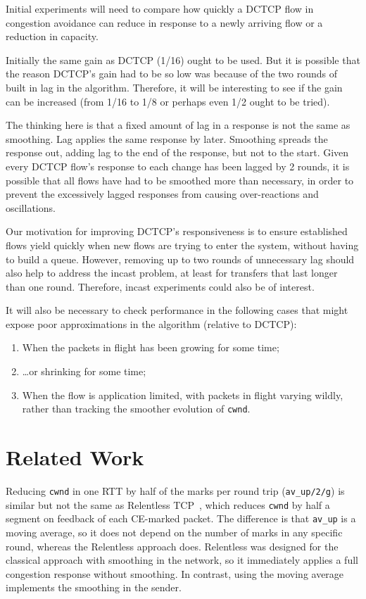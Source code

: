 Initial experiments will need to compare how quickly a DCTCP flow in congestion
avoidance can reduce in response to a newly arriving flow or a reduction in
capacity.

Initially the same gain as DCTCP (1/16) ought to be used. But it is possible
that the reason DCTCP's gain had to be so low was because of the two rounds of
built in lag in the algorithm. Therefore, it will be interesting to see if the
gain can be increased (from 1/16 to 1/8 or perhaps even 1/2 ought to be tried).

The thinking here is that a fixed amount of lag in a response is not the same as
smoothing. Lag applies the same response by later. Smoothing spreads the
response out, adding lag to the end of the response, but not to the start. Given
every DCTCP flow's response to each change has been lagged by 2 rounds, it is
possible that all flows have had to be smoothed more than necessary, in order to
prevent the excessively lagged responses from causing over-reactions and
oscillations.

Our motivation for improving DCTCP's responsiveness is to ensure established
flows yield quickly when new flows are trying to enter the system, without
having to build a queue. However, removing up to two rounds of unnecessary lag
should also help to address the incast problem, at least for transfers that last
longer than one round. Therefore, incast experiments could also be of interest.

It will also be necessary to check performance in the following cases that might
expose poor approximations in the algorithm (relative to DCTCP):
\begin{enumerate}
	\item When the packets in flight has been growing for some time;
	\item \ldots{}or shrinking for some time;
	\item When the flow is application limited, with packets in flight varying
	wildly, rather than tracking the smoother evolution of \texttt{cwnd}.
\end{enumerate}


\section{Related Work}\label{prresp_related}
\balance
Reducing \texttt{cwnd} in one RTT by half of the marks per round trip
(\texttt{av\_up/2/g}) is similar but not the same as Relentless
TCP~\cite{Mathis09:Relentless}, which reduces \texttt{cwnd} by half a segment on
feedback of each CE-marked packet. The difference is that \texttt{av\_up} is a
moving average, so it does not depend on the number of marks in any specific
round, whereas the Relentless approach does. Relentless was designed for the
classical approach with smoothing in the network, so it immediately applies a
full congestion response without smoothing. In contrast, using the moving
average implements the smoothing in the sender.

